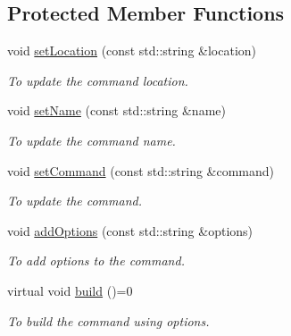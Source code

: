 \subsection*{Protected Member Functions}
\begin{DoxyCompactItemize}
\item 
void \hyperlink{classFileTransferCommand_a09486cc2c9565c471b8e7777d5c5edae}{setLocation} (const std::string \&location)
\begin{DoxyCompactList}\small\item\em To update the command location. \item\end{DoxyCompactList}\item 
void \hyperlink{classFileTransferCommand_a76e8a020f622b149249d826c7bfb15f3}{setName} (const std::string \&name)
\begin{DoxyCompactList}\small\item\em To update the command name. \item\end{DoxyCompactList}\item 
void \hyperlink{classFileTransferCommand_a360f6048bf450909531cb1b3b8ebf1ea}{setCommand} (const std::string \&command)
\begin{DoxyCompactList}\small\item\em To update the command. \item\end{DoxyCompactList}\item 
void \hyperlink{classFileTransferCommand_a392a21a5fd210c114a10dd0caa9cb83a}{addOptions} (const std::string \&options)
\begin{DoxyCompactList}\small\item\em To add options to the command. \item\end{DoxyCompactList}\item 
\hypertarget{classFileTransferCommand_a6bc5464c23092d8d9df829bda2bab517}{
virtual void \hyperlink{classFileTransferCommand_a6bc5464c23092d8d9df829bda2bab517}{build} ()=0}
\label{classFileTransferCommand_a6bc5464c23092d8d9df829bda2bab517}

\begin{DoxyCompactList}\small\item\em To build the command using options. \item\end{DoxyCompactList}\end{DoxyCompactItemize}
